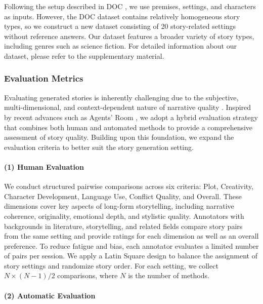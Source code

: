 \documentclass[letterpaper]{article} %
\begin{document}
Following the setup described in DOC \cite{yang-etal-2023-doc}, we use premises, settings, and characters as inputs. However, the DOC dataset contains relatively homogeneous story types, so we construct a new dataset consisting of 20 story-related settings without reference answers. Our dataset features a broader variety of story types, including genres such as science fiction. For detailed information about our dataset, please refer to the supplementary material.

\subsubsection{Evaluation Metrics}

Evaluating generated stories is inherently challenging due to the subjective, multi-dimensional, and context-dependent nature of narrative quality \cite{guan-huang-2020-union, chhun-etal-2022-human, yang2024makes}. Inspired by recent advances such as Agents' Room \cite{huot2024agents}, we adopt a hybrid evaluation strategy that combines both human and automated methods to provide a comprehensive assessment of story quality. Building upon this foundation, we expand the evaluation criteria to better suit the story generation setting.

\paragraph{(1) Human Evaluation}

We conduct structured pairwise comparisons across six criteria: Plot, Creativity, Character Development, Language Use, Conflict Quality, and Overall. These dimensions cover key aspects of long-form storytelling, including narrative coherence, originality, emotional depth, and stylistic quality. Annotators with backgrounds in literature, storytelling, and related fields compare story pairs from the same setting and provide ratings for each dimension as well as an overall preference. To reduce fatigue and bias, each annotator evaluates a limited number of pairs per session. We apply a Latin Square design to balance the assignment of story settings and randomize story order. For each setting, we collect $N \times (N - 1) / 2$ comparisons, where $N$ is the number of methods.

\paragraph{(2) Automatic Evaluation}
\end{document}
